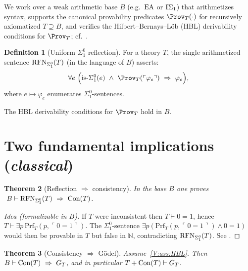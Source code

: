 \documentclass[11pt]{article}
\newtheorem{theorem}{Theorem}[section]
\theoremstyle{definition}
\newtheorem{definition}[theorem]{Definition}
\theoremstyle{remark}
\begin{document}
We work over a weak arithmetic base \(B\) (e.g.\ \(\mathrm{EA}\) or \(\mathrm{I}\Sigma_1\)) that arithmetizes syntax,
supports the canonical provability predicates \(\Prov_T(\cdot)\) for recursively axiomatized \(T\supseteq B\),
and verifies the Hilbert–Bernays–L\"ob (HBL) derivability conditions for \(\Prov_T\); cf.\ \cite{HajekPudlak}.

\begin{definition}[Uniform $\Sigma^0_1$ reflection]\label{V:def:RFN}
For a theory \(T\), the single arithmetized sentence \(\mathrm{RFN}_{\Sigma^0_1}(T)\) (in the language of \(B\)) asserts:
\[
\forall e\ \Big(\mathrm{is}\text{-}\Sigma^0_1(e)\ \wedge\ \Prov_T(\ulcorner \varphi_e\urcorner)\ \Rightarrow\ \varphi_e\Big),
\]
where \(e\mapsto \varphi_e\) enumerates \(\Sigma^0_1\)-sentences.
\end{definition}

\begin{assumption}\label{V:ass:HBL}
The HBL derivability conditions for \(\Prov_T\) hold in \(B\).
\end{assumption}

\section{Two fundamental implications (\emph{classical})}

\begin{theorem}[Reflection $\Rightarrow$ consistency]\label{V:thm:RFN-implies-Con}
In the base \(B\) one proves \(\ B\vdash \RFNSigOne(T)\ \Rightarrow\ \Con(T)\).
\end{theorem}

\begin{proof}[Idea (formalizable in \(B\))]
If \(T\) were inconsistent then \(T\vdash 0=1\), hence \(T\vdash \exists p\,\mathrm{Prf}_T(p,\ulcorner 0=1\urcorner)\).
The \(\Sigma^0_1\)-sentence \(\exists p(\mathrm{Prf}_T(p,\ulcorner 0=1\urcorner)\wedge 0=1)\) would then be provable in \(T\) but false in \(\mathbb N\), contradicting \(\mathrm{RFN}_{\Sigma^0_1}(T)\). See \cite[§I]{HajekPudlak}.
\end{proof}

\begin{theorem}[Consistency $\Rightarrow$ G\"odel]\label{V:thm:Con-implies-G}
Assume~\ref{V:ass:HBL}. Then \(B\vdash \mathrm{Con}(T)\ \Rightarrow\ G_T\), and in particular \(T+\mathrm{Con}(T)\vdash G_T\).
\end{theorem}
\end{document}
